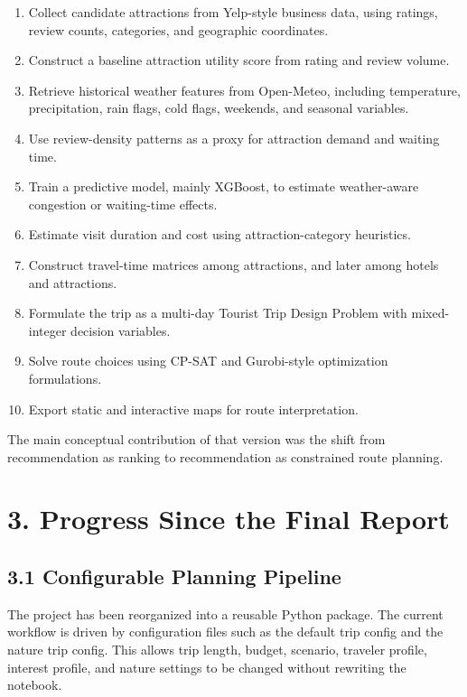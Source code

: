 \documentclass[11pt,a4paper]{article}
\begin{document}
\begin{enumerate}
    \item Collect candidate attractions from Yelp-style business data, using ratings, review counts, categories, and geographic coordinates.
    \item Construct a baseline attraction utility score from rating and review volume.
    \item Retrieve historical weather features from Open-Meteo, including temperature, precipitation, rain flags, cold flags, weekends, and seasonal variables.
    \item Use review-density patterns as a proxy for attraction demand and waiting time.
    \item Train a predictive model, mainly XGBoost, to estimate weather-aware congestion or waiting-time effects.
    \item Estimate visit duration and cost using attraction-category heuristics.
    \item Construct travel-time matrices among attractions, and later among hotels and attractions.
    \item Formulate the trip as a multi-day Tourist Trip Design Problem with mixed-integer decision variables.
    \item Solve route choices using CP-SAT and Gurobi-style optimization formulations.
    \item Export static and interactive maps for route interpretation.
\end{enumerate}

\noindent The main conceptual contribution of that version was the shift from recommendation as ranking to recommendation as constrained route planning.

\section*{3. Progress Since the Final Report}

\subsection*{3.1 Configurable Planning Pipeline}

\noindent The project has been reorganized into a reusable Python package. The current workflow is driven by configuration files such as the default trip config and the nature trip config. This allows trip length, budget, scenario, traveler profile, interest profile, and nature settings to be changed without rewriting the notebook.
\end{document}
